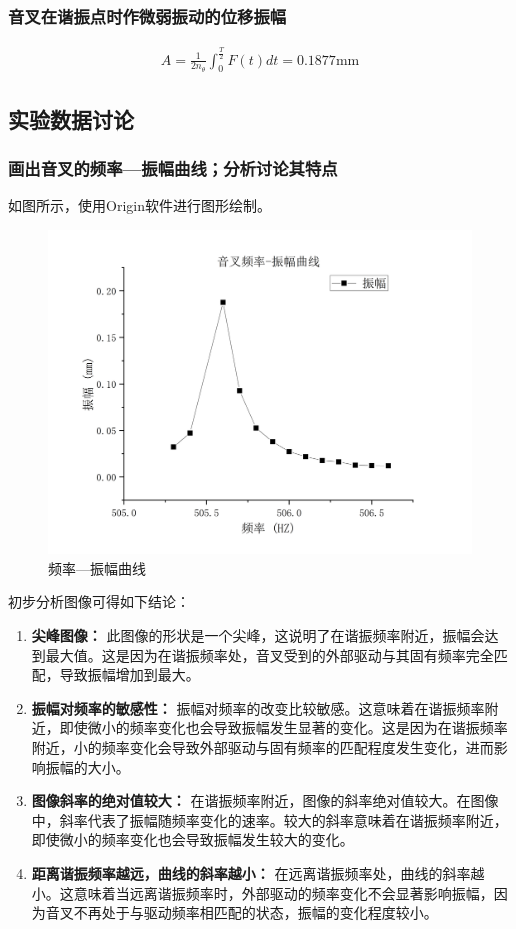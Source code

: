 \documentclass[dvipsnames, svgnames,a4paper,11pt]{article}
\begin{document}
	\subsubsection{ 音叉在谐振点时作微弱振动的位移振幅}
	$$\begin{aligned}A=\frac{1}{2n_\theta}\int_0^{\frac{T}{2}}F(t)dt=0.1877\text{mm}\end{aligned}$$
	\subsection{实验数据讨论}
	\subsubsection{ 画出音叉的频率—振幅曲线；分析讨论其特点}
	如图所示，使用Origin软件进行图形绘制。
	\begin{figure}[H]
		\centering
		\includegraphics[width=0.8\linewidth]{images/振幅曲线}
		\caption{频率—振幅曲线}
		\label{频率—振幅曲线}
	\end{figure}
	初步分析图像可得如下结论：
	\begin{enumerate}
		\item \textbf{尖峰图像：} 此图像的形状是一个尖峰，这说明了在谐振频率附近，振幅会达到最大值。这是因为在谐振频率处，音叉受到的外部驱动与其固有频率完全匹配，导致振幅增加到最大。
		
		\item \textbf{振幅对频率的敏感性：} 振幅对频率的改变比较敏感。这意味着在谐振频率附近，即使微小的频率变化也会导致振幅发生显著的变化。这是因为在谐振频率附近，小的频率变化会导致外部驱动与固有频率的匹配程度发生变化，进而影响振幅的大小。
		
		\item \textbf{图像斜率的绝对值较大：} 在谐振频率附近，图像的斜率绝对值较大。在图像中，斜率代表了振幅随频率变化的速率。较大的斜率意味着在谐振频率附近，即使微小的频率变化也会导致振幅发生较大的变化。
		
		\item \textbf{距离谐振频率越远，曲线的斜率越小：} 在远离谐振频率处，曲线的斜率越小。这意味着当远离谐振频率时，外部驱动的频率变化不会显著影响振幅，因为音叉不再处于与驱动频率相匹配的状态，振幅的变化程度较小。
	\end{enumerate}
\end{document}

